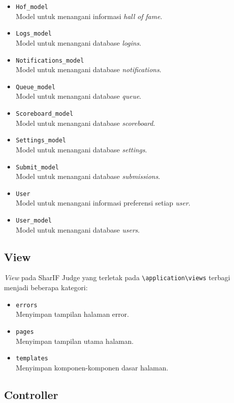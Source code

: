 \begin{itemize}
	\item \verb|Hof_model| \\ Model untuk menangani informasi \textit{hall of fame}.
	\item \verb|Logs_model| \\ Model untuk menangani database \textit{logins}.
	\item \verb|Notifications_model| \\ Model untuk menangani database \textit{notifications}.
	\item \verb|Queue_model| \\ Model untuk menangani database \textit{queue}.
	\item \verb|Scoreboard_model| \\ Model untuk menangani database \textit{scoreboard}.
	\item \verb|Settings_model| \\ Model untuk menangani database \textit{settings}.
	\item \verb|Submit_model| \\ Model untuk menangani database \textit{submissions}.
	\item \verb|User| \\ Model untuk menangani informasi preferensi setiap \textit{user}.
	\item \verb|User_model| \\ Model untuk menangani database \textit{users}.
\end{itemize}

\subsection{View}
\label{subs:sjview}

\textit{View} pada SharIF Judge yang terletak pada \verb|\application\views| terbagi menjadi beberapa kategori:

\begin{itemize}
	\item \verb|errors| \\ Menyimpan tampilan halaman error.
	\item \verb|pages| \\ Menyimpan tampilan utama halaman.
	\item \verb|templates| \\ Menyimpan komponen-komponen dasar halaman.
\end{itemize}

\subsection{Controller}
\label{subs:sjcontroller}

